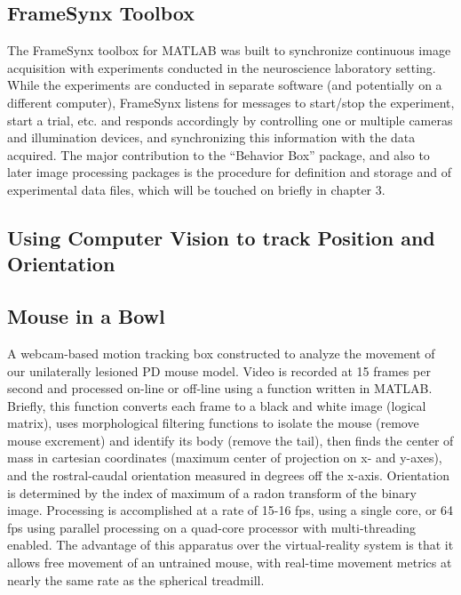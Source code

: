 \documentclass[../main.tex]{subfiles}
\begin{document}
\subsection{
	FrameSynx Toolbox}\label{sec:framesynx-toolbox}

The FrameSynx toolbox for MATLAB was built to synchronize continuous image acquisition with experiments conducted in the neuroscience laboratory setting.
While the experiments are conducted in separate software (and potentially on a different computer), FrameSynx listens for messages to start/stop the experiment, start a trial, etc. and responds accordingly by controlling one or multiple cameras and illumination devices, and synchronizing this information with the data acquired.
The major contribution to the ``Behavior Box'' package, and also to later image processing packages is the procedure for definition and storage and of experimental data files, which will be touched on briefly in chapter 3.

\subsection{Using Computer Vision to track Position and Orientation}\label{sec:using-computer-vision-to-track-position-and-orientation}

\subsection{Mouse in a Bowl}\label{sec:mouse-in-a-bowl}

A webcam-based motion tracking box constructed to analyze the movement of our unilaterally lesioned PD mouse model.
Video is recorded at 15 frames per second and processed on-line or off-line using a function written in MATLAB.
Briefly, this function converts each frame to a black and white image (logical matrix), uses morphological filtering functions to isolate the mouse (remove mouse excrement) and identify its body (remove the tail), then finds the center of mass in cartesian coordinates (maximum center of projection on x- and y-axes), and the rostral-caudal orientation measured in degrees off the x-axis.
Orientation is determined by the index of maximum of a radon transform of the binary image.
Processing is accomplished at a rate of 15-16 fps, using a single core, or 64 fps using parallel processing on a quad-core processor with multi-threading enabled.
The advantage of this apparatus over the virtual-reality system is that it allows free movement of an untrained mouse, with real-time movement metrics at nearly the same rate as the spherical treadmill.
\end{document}
